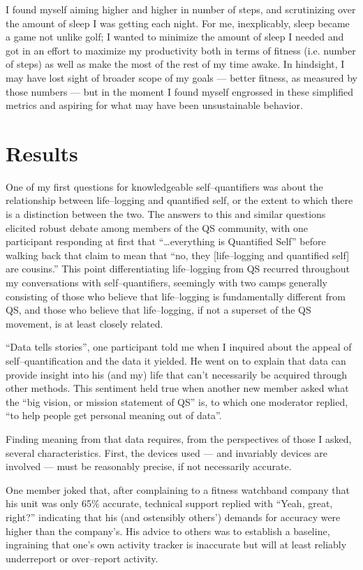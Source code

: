 \documentclass{article}
\begin{document}
I found myself aiming higher and higher in number of steps,
and scrutinizing over the amount of sleep I was getting each night.
For me,
inexplicably,
sleep became a game not unlike golf;
I wanted to minimize the amount of sleep I needed and got in an effort to maximize my productivity both in terms of fitness (i.e.
number of steps) as well as make the most of the rest of my time awake.
In hindsight,
I may have lost sight of broader scope of my goals
--- better fitness,
as measured by those numbers
--- but in the moment I found myself engrossed in these simplified metrics and aspiring for what may have been unsustainable behavior.

\section*{Results}
One of my first questions for knowledgeable self--quantifiers was about the relationship between life--logging and quantified self,
or the extent to which there is a distinction between the two.
The answers to this and similar questions elicited robust debate among members of the QS community,
with one participant responding at first that ``\dots everything is Quantified Self'' before walking back that claim to mean that ``no,
they [life--logging and quantified self] are cousins.'' This point differentiating life--logging from QS recurred throughout my conversations with self--quantifiers,
seemingly with two camps generally consisting of those who believe that life--logging is fundamentally different from QS,
and those who believe that life--logging,
if not a superset of the QS movement,
is at least closely related.

``Data tells stories'',
one participant told me when I inquired about the appeal of self--quantification and the data it yielded.
He went on to explain that data can provide insight into his (and my) life that can't necessarily be acquired through other  methods.
This sentiment held true when another new member asked what the ``big vision,
or mission statement of QS'' is,
to which one moderator replied,
``to help people get personal meaning out of data''.

Finding meaning from that data requires,
from the perspectives of those I asked,
several characteristics.
First,
the devices used
--- and invariably devices are involved ---
must be reasonably precise,
if not necessarily accurate.

One member joked that,
after complaining to a fitness watchband company that his unit was only 65\% accurate,
technical support replied with ``Yeah,
great,
right?'' indicating that his (and ostensibly others') demands for accuracy were higher than the company's. 
His advice to others was to establish a baseline,
ingraining that one's own activity tracker is inaccurate but will at least reliably underreport or over--report activity.
\end{document}
